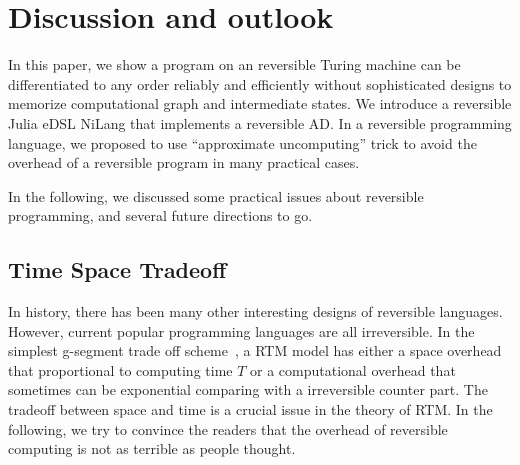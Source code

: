 \documentclass[aps,twocolumn,longbibliography,english,superscriptaddress]{revtex4-1}
\newcommand{\<}{\langle}
\renewcommand{\>}{\rangle}
\theoremstyle{definition}\newtheorem{definition}{\textit{Definition}}
\begin{document}
\section{Discussion and outlook}\label{sec:discussion}
In this paper, we show a program on an reversible Turing machine can be differentiated to any order reliably and efficiently without sophisticated designs to memorize computational graph and intermediate states. 
We introduce a reversible Julia eDSL NiLang that implements a reversible AD. In a reversible programming language, we proposed to use ``approximate uncomputing'' trick to avoid the overhead of a reversible program in many practical cases.

In the following, we discussed some practical issues about reversible programming, and several future directions to go.

\subsection{Time Space Tradeoff}\label{sec:timespace}
In history, there has been many other interesting designs of reversible languages. However, current popular programming languages are all irreversible.
In the simplest g-segment trade off scheme~\cite{Bennett1989,Levine1990}, a RTM model has either a space overhead that proportional to computing time $T$ or a computational overhead that sometimes can be exponential comparing with a irreversible counter part.
The tradeoff between space and time is a crucial issue in the theory of RTM.
In the following, we try to convince the readers that the overhead of reversible computing is not as terrible as people thought.
\end{document}
